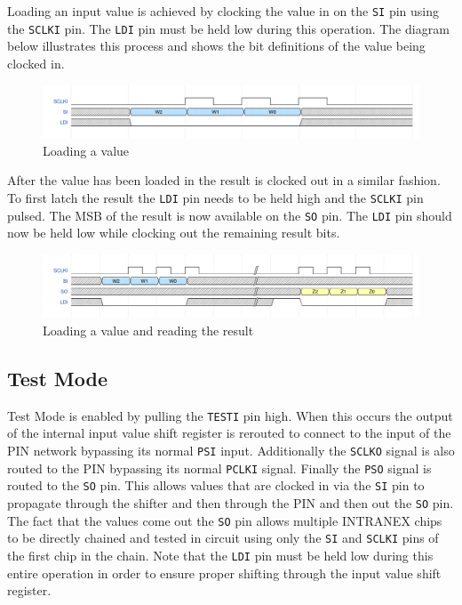 Loading an input value is achieved by clocking the value in on the \texttt{SI}
pin using the \texttt{SCLKI} pin. The \texttt{LDI} pin must be held low during
this operation. The diagram below illustrates this process and shows the bit
definitions of the value being clocked in.

\begin{figure}[H]
    \centering
    \includegraphics[width=\linewidth]{../waveforms/shift_load.png}
    \caption{Loading a value}
\end{figure}

After the value has been loaded in the result is clocked out in a similar
fashion. To first latch the result the \texttt{LDI} pin needs to be held high
and the \texttt{SCLKI} pin pulsed. The MSB of the result is now available on
the \texttt{SO} pin. The \texttt{LDI} pin should now be held low while clocking out
the remaining result bits.

\begin{figure}[H]
    \centering
    \includegraphics[width=\linewidth]{../waveforms/shift_load_read.png}
    \caption{Loading a value and reading the result}
\end{figure}

\subsection{Test Mode}

Test Mode is enabled by pulling the \texttt{TESTI} pin high. When this occurs
the output of the internal input value shift register is rerouted to connect to
the input of the PIN network bypassing its normal \texttt{PSI} input.
Additionally the \texttt{SCLKO} signal is also routed to the PIN bypassing its
normal \texttt{PCLKI} signal. Finally the \texttt{PSO} signal is routed to the
\texttt{SO} pin. This allows values that are clocked in via the \texttt{SI} pin
to propagate through the shifter and then through the PIN and then out the
\texttt{SO} pin. The fact that the values come out the \texttt{SO} pin allows
multiple INTRANEX chips to be directly chained and tested in circuit using only
the \texttt{SI} and \texttt{SCLKI} pins of the first chip in the chain. Note
that the \texttt{LDI} pin must be held low during this entire operation in
order to ensure proper shifting through the input value shift register.

